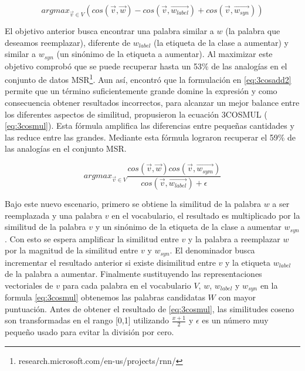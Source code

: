 \begin{equation}
\label{eq:3cosadd2}
    arg max_{\vec{v}\in V}( cos(\vec{v}, \vec{w}) - cos(\vec{v}, \vec{w_{label}}) + cos(\vec{v}, \vec{w_{syn}}) )
    \end{equation}

El objetivo anterior busca encontrar una palabra similar a $w$ (la palabra que deseamos reemplazar), diferente de $w_{label}$ (la etiqueta de la clase a aumentar) y similar a $w_{syn}$ (un sinónimo de la etiqueta a aumentar). Al maximizar este objetivo \citep{mikolov2013distributed} comprobó que se puede recuperar hasta un 53\% de las analogías en el conjunto de datos MSR\footnote{research.microsoft.com/en-us/projects/rnn/}. Aun así, \citep{levy2014linguistic} encontró que la formulación en \ref{eq:3cosadd2} permite que un término suficientemente grande domine la expresión y como consecuencia obtener resultados incorrectos, para alcanzar un mejor balance entre los diferentes aspectos de similitud, propusieron la ecuación 3COSMUL ( \ref{eq:3cosmul}). Esta fórmula amplifica las diferencias entre pequeñas cantidades y las reduce entre las grandes. Mediante esta fórmula lograron recuperar el 59\% de las analogías en el conjunto MSR.

\begin{equation}
    \label{eq:3cosmul}
    arg max_{\vec{v}\in V} \frac{ cos(\vec{v}, \vec{w}) cos(\vec{v}, \vec{w_{sym}})}
    { cos(\vec{v}, \vec{w_{label}})+ \epsilon}
\end{equation}

Bajo este nuevo escenario, primero se obtiene la similitud de la palabra $w$ a ser reemplazada y una palabra $v$ en el vocabulario, el resultado es multiplicado por la similitud de la palabra $v$ y un sinónimo de la etiqueta de la clase a aumentar $w_{syn}$. Con esto se espera amplificar la similitud entre $v$ y la palabra a reemplazar $w$ por la magnitud de la similitud entre $v$ y $w_{syn}$. El denominador busca incrementar el resultado anterior si existe disimilitud entre $v$ y la etiqueta $w_{label}$ de la palabra a aumentar. 
Finalmente sustituyendo las representaciones vectoriales de $v$ para cada palabra en el vocabulario $V$, $w$, $w_{label}$ y $w_{syn}$ en la formula \ref{eq:3cosmul} obtenemos las palabras candidatas $W$ con mayor puntuación. Antes de obtener el resultado de \ref{eq:3cosmul}, las similitudes coseno son transformadas en el rango [0,1] utilizando $\frac{x+1}{2}$ y $\epsilon$ es un número muy pequeño usado para evitar la división por cero.

